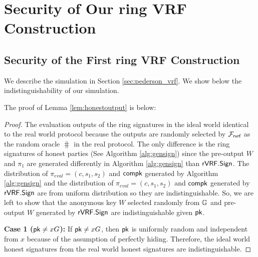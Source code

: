 %
\section{Security of Our ring VRF Construction}

\subsection{Security of the First ring VRF Construction}
\label{ap:firstprotocolproof}
We describe the simulation in Section \ref{sec:pederson_vrf}. We show below the indistinguishability of our simulation.

The  proof of Lemma \ref{lem:honestoutput} is below:

\begin{proof}
	The evaluation outputs of the ring signatures in the ideal world identical to the real world protocol because  the outputs are randomly selected by $ \mathcal{F}_{\textsf{rvrf}} $ as the random oracle $ \hash $ in the real protocol. The only difference is the ring signatures of honest parties (See Algorithm \ref{alg:gensign}) since the pre-output $ W $ and $ \pi_1 $ are generated differently in Algorithm \ref{alg:gensign} than $ {\mathsf{rVRF}}.{\mathsf{Sign}} $. The distribution of $ \pi_{eval} = (c,s_1, s_2) $ and $ \mathsf{compk} $ generated by Algorithm \ref{alg:gensign} and the distribution of $ \pi_{eval} = (c,s_1, s_2) $ and $ \mathsf{compk} $ generated by $ {\mathsf{rVRF}}.{\mathsf{Sign}} $ are from uniform distribution so they are indistinguishable. So, we are left to show that the anonymous key $ W $ selected randomly from $ {\mathbb{G}} $ and pre-output $	 W $ generated by $ {\mathsf{rVRF}}.{\mathsf{Sign}} $ are indistinguishable given $ \mathsf{pk}  $. 
	
	\textbf{Case 1 ($ \mathsf{pk} \neq x G$):} If  $ \mathsf{pk} \neq x G$, then  $ \mathsf{pk} $ is uniformly random and independent from $ x $ because of the assumption of perfectly hiding. Therefore,  the ideal world honest signatures from the real world honest signatures are indistinguishable.
	

\end{proof}
